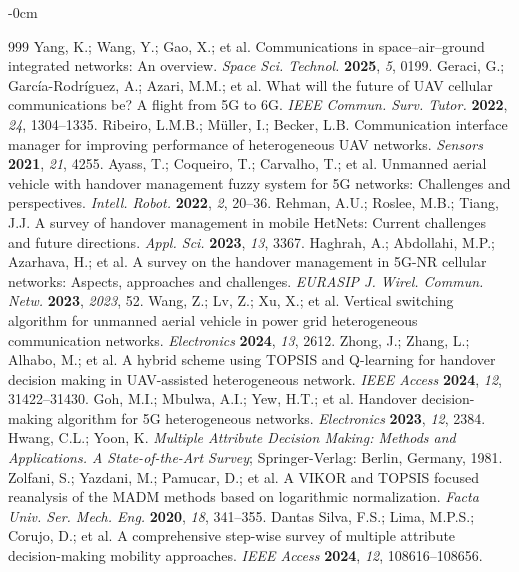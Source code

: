 \documentclass[remotesensing,article,submit,moreauthors]{Definitions/mdpi}
\begin{document}
\begin{adjustwidth}{-\extralength}{0cm}


\begin{thebibliography}{999}
Yang, K.; Wang, Y.; Gao, X.; et al. Communications in space--air--ground integrated networks: An overview. {\em Space Sci. Technol.} {\bf 2025}, {\em 5}, 0199.
Geraci, G.; García-Rodríguez, A.; Azari, M.M.; et al. What will the future of UAV cellular communications be? A flight from 5G to 6G. {\em IEEE Commun. Surv. Tutor.} {\bf 2022}, {\em 24}, 1304--1335.
Ribeiro, L.M.B.; Müller, I.; Becker, L.B. Communication interface manager for improving performance of heterogeneous UAV networks. {\em Sensors} {\bf 2021}, {\em 21}, 4255.
Ayass, T.; Coqueiro, T.; Carvalho, T.; et al. Unmanned aerial vehicle with handover management fuzzy system for 5G networks: Challenges and perspectives. {\em Intell. Robot.} {\bf 2022}, {\em 2}, 20--36.
Rehman, A.U.; Roslee, M.B.; Tiang, J.J. A survey of handover management in mobile HetNets: Current challenges and future directions. {\em Appl. Sci.} {\bf 2023}, {\em 13}, 3367.
Haghrah, A.; Abdollahi, M.P.; Azarhava, H.; et al. A survey on the handover management in 5G-NR cellular networks: Aspects, approaches and challenges. {\em EURASIP J. Wirel. Commun. Netw.} {\bf 2023}, {\em 2023}, 52.
Wang, Z.; Lv, Z.; Xu, X.; et al. Vertical switching algorithm for unmanned aerial vehicle in power grid heterogeneous communication networks. {\em Electronics} {\bf 2024}, {\em 13}, 2612.
Zhong, J.; Zhang, L.; Alhabo, M.; et al. A hybrid scheme using TOPSIS and Q-learning for handover decision making in UAV-assisted heterogeneous network. {\em IEEE Access} {\bf 2024}, {\em 12}, 31422--31430.
Goh, M.I.; Mbulwa, A.I.; Yew, H.T.; et al. Handover decision-making algorithm for 5G heterogeneous networks. {\em Electronics} {\bf 2023}, {\em 12}, 2384.
Hwang, C.L.; Yoon, K. \textit{Multiple Attribute Decision Making: Methods and Applications. A State-of-the-Art Survey}; Springer-Verlag: Berlin, Germany, 1981.
Zolfani, S.; Yazdani, M.; Pamucar, D.; et al. A VIKOR and TOPSIS focused reanalysis of the MADM methods based on logarithmic normalization. {\em Facta Univ. Ser. Mech. Eng.} {\bf 2020}, {\em 18}, 341--355.
Dantas Silva, F.S.; Lima, M.P.S.; Corujo, D.; et al. A comprehensive step-wise survey of multiple attribute decision-making mobility approaches. {\em IEEE Access} {\bf 2024}, {\em 12}, 108616--108656.

\end{thebibliography}
\end{adjustwidth}
\end{document}
